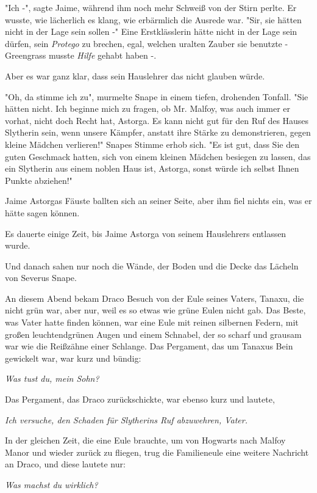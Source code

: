 {"Ich -", sagte Jaime, während ihm noch mehr Schweiß von der Stirn perlte. Er wusste, wie lächerlich es klang, wie erbärmlich die Ausrede war. "Sir, sie hätten nicht in der Lage sein sollen -" Eine Erstklässlerin hätte nicht in der Lage sein dürfen, sein \emph{Protego} zu brechen, egal, welchen uralten Zauber sie benutzte - Greengrass musste \emph{Hilfe} gehabt haben -.

Aber es war ganz klar, dass sein Hauslehrer das nicht glauben würde.

"Oh, da stimme ich zu", murmelte Snape in einem tiefen, drohenden Tonfall. "Sie hätten nicht. Ich beginne mich zu fragen, ob Mr. Malfoy, was auch immer er vorhat, nicht doch Recht hat, Astorga. Es kann nicht gut für den Ruf des Hauses Slytherin sein, wenn unsere Kämpfer, anstatt ihre Stärke zu demonstrieren, gegen kleine Mädchen verlieren!" Snapes Stimme erhob sich. "Es ist gut, dass Sie den guten Geschmack hatten, sich von einem kleinen Mädchen besiegen zu lassen, das ein Slytherin aus einem noblen Haus ist, Astorga, sonst würde ich selbst Ihnen Punkte abziehen!"

Jaime Astorgas Fäuste ballten sich an seiner Seite, aber ihm fiel nichts ein, was er hätte sagen können.

Es dauerte einige Zeit, bis Jaime Astorga von seinem Hauslehrers entlassen wurde.

Und danach sahen nur noch die Wände, der Boden und die Decke das Lächeln von Severus Snape.

An diesem Abend bekam Draco Besuch von der Eule seines Vaters, Tanaxu, die nicht grün war, aber nur, weil es so etwas wie grüne Eulen nicht gab. Das Beste, was Vater hatte finden können, war eine Eule mit reinen silbernen Federn, mit großen leuchtendgrünen Augen und einem Schnabel, der so scharf und grausam war wie die Reißzähne einer Schlange. Das Pergament, das um Tanaxus Bein gewickelt war, war kurz und bündig:

\emph{Was tust du, mein Sohn?}

Das Pergament, das Draco zurückschickte, war ebenso kurz und lautete,

\emph{\emph{Ich versuche, den Schaden für Slytherins Ruf} \emph{abzuwehren, Vater.}}

In der gleichen Zeit, die eine Eule brauchte, um von Hogwarts nach Malfoy Manor und wieder zurück zu fliegen, trug die Familieneule eine weitere Nachricht an Draco, und diese lautete nur:

\emph{Was machst du wirklich?}

}
